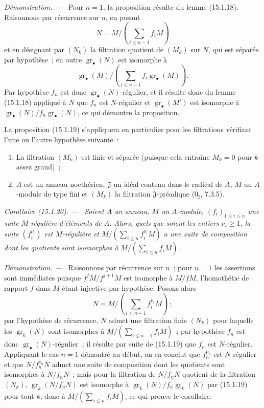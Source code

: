 \documentclass[10pt,oneside]{book}
\makeatletter
\newcommand{\gr}{\operatorname{gr}}
\newcommand{\setmanualcurrentlabel}[1]{\def\@currentlabel{#1}}
\newcommand{\oldpage}[2][]{%
  \setcounter{footnote}{0}%
  \marginpar{\scriptsize\textbf{#1}~|~#2}\ignorespaces}
\newenvironment{corollary}[1][]{%
  \setmanualcurrentlabel{#1}\par\medskip\noindent\itshape Corollaire (#1). ---\ }{\par}
\newenvironment{proof}{%
  \par\medskip\noindent\textit{Démonstration. ---\ }}{\par}
\makeatother
\begin{document}
\begin{proof}
Pour $n=1$, la proposition résulte du lemme (15.1.18). Raisonnons par
récurrence sur $n$, en posant
\[
  N=M/\left(\sum_{i\leq n-1}f_iM\right)
\]
et en désignant par $(N_k)$ la filtration quotient de $(M_k)$ sur $N$, qui
est séparée par hypothèse~; en outre $\gr_\bullet(N)$ est isomorphe à
\[
  \gr_\bullet(M)/
  \left(\sum_{i\leq n-1}f_i\gr_\bullet(M)\right).
\]
Par hypothèse $f_n$ est donc $\gr_\bullet(N)$-régulier, et il résulte donc du
lemme (15.1.18) appliqué à $N$ que $f_n$ est $N$-régulier et
$\gr_\bullet(M')$ est isomorphe à
$\gr_\bullet(N)/f_n\gr_\bullet(N)$, ce qui démontre la proposition.
\end{proof}

La proposition (15.1.19) s'appliquera en particulier pour les filtrations
vérifiant l'une ou l'autre hypothèse suivante~:
\begin{enumerate}
  \item[$1^\circ$] La filtration $(M_k)$ est finie et séparée (puisque cela
  entraîne $M_k=0$ pour $k$ assez grand)~;
  \item[$2^\circ$] $A$ est un anneau noethérien, $\mathfrak{J}$ un idéal
  contenu dans le radical de $A$, $M$ un $A$-module de type fini et $(M_k)$
  la filtration $\mathfrak{J}$-préadique ($0_{\mathrm I}$, 7.3.5).
\end{enumerate}

\begin{corollary}[15.1.20]
\label{0.15.1.20-fr}
\oldpage[0\textsubscript{IV-1}]{20}
Soient $A$ un anneau, $M$ un $A$-module, $(f_i)_{1\leq i\leq n}$ une suite
$M$-régulière d'éléments de $A$. Alors, quels que soient les entiers
$\nu_i\geq1$, la suite $(f_i^{\nu_i})$ est $M$-régulière et
$M/(\sum_{i\leq n}f_i^{\nu_i}M)$ a une suite de composition dont les
quotients sont isomorphes à $M/(\sum_{i\leq n}f_iM)$.
\end{corollary}

\begin{proof}
Raisonnons par récurrence sur $n$~; pour $n=1$ les assertions sont immédiates
puisque $f^jM/f^{j+1}M$ est isomorphe à $M/fM$, l'homothétie de rapport $f$
dans $M$ étant injective par hypothèse. Posons alors
\[
  N=M/\left(\sum_{i\leq n-1}f_i^{\nu_i}M\right)~;
\]
par l'hypothèse de récurrence, $N$ admet une filtration finie $(N_k)$ pour
laquelle les $\gr_k(N)$ sont isomorphes à
$M/(\sum_{i\leq n-1}f_iM)$~; par hypothèse $f_n$ est donc
$\gr_\bullet(N)$-régulier~; il résulte par suite de (15.1.19) que $f_n$ est
$N$-régulier. Appliquant le cas $n=1$ démontré au début, on en conclut que
$f_n^{\nu_n}$ est $N$-régulier et que $N/f_n^{\nu_n}N$ admet une suite de
composition dont les quotients sont isomorphes à $N/f_nN$~; mais pour la
filtration de $N/f_nN$ quotient de la filtration $(N_k)$,
$\gr_k(N/f_nN)$ est isomorphe à $\gr_k(N)/f_n\gr_k(N)$ par (15.1.19) pour
tout $k$, donc à $M/(\sum_{i\leq n}f_iM)$, ce qui prouve le corollaire.
\end{proof}
\end{document}
